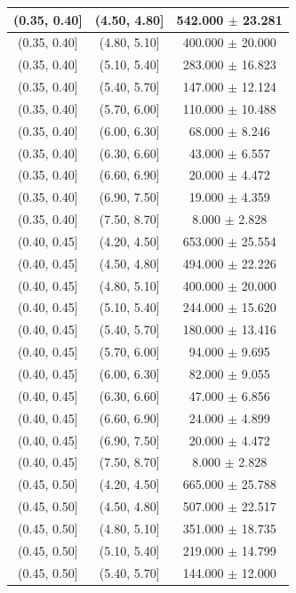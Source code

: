 \begin{longtable}{|c|c|c|}
\hline
(0.35, 0.40] & (4.50, 4.80] & 542.000 $\pm$ 23.281 \\ 
\hline
(0.35, 0.40] & (4.80, 5.10] & 400.000 $\pm$ 20.000 \\ 
\hline
(0.35, 0.40] & (5.10, 5.40] & 283.000 $\pm$ 16.823 \\ 
\hline
(0.35, 0.40] & (5.40, 5.70] & 147.000 $\pm$ 12.124 \\ 
\hline
(0.35, 0.40] & (5.70, 6.00] & 110.000 $\pm$ 10.488 \\ 
\hline
(0.35, 0.40] & (6.00, 6.30] & 68.000 $\pm$ 8.246 \\ 
\hline
(0.35, 0.40] & (6.30, 6.60] & 43.000 $\pm$ 6.557 \\ 
\hline
(0.35, 0.40] & (6.60, 6.90] & 20.000 $\pm$ 4.472 \\ 
\hline
(0.35, 0.40] & (6.90, 7.50] & 19.000 $\pm$ 4.359 \\ 
\hline
(0.35, 0.40] & (7.50, 8.70] & 8.000 $\pm$ 2.828 \\ 
\hline
(0.40, 0.45] & (4.20, 4.50] & 653.000 $\pm$ 25.554 \\ 
\hline
(0.40, 0.45] & (4.50, 4.80] & 494.000 $\pm$ 22.226 \\ 
\hline
(0.40, 0.45] & (4.80, 5.10] & 400.000 $\pm$ 20.000 \\ 
\hline
(0.40, 0.45] & (5.10, 5.40] & 244.000 $\pm$ 15.620 \\ 
\hline
(0.40, 0.45] & (5.40, 5.70] & 180.000 $\pm$ 13.416 \\ 
\hline
(0.40, 0.45] & (5.70, 6.00] & 94.000 $\pm$ 9.695 \\ 
\hline
(0.40, 0.45] & (6.00, 6.30] & 82.000 $\pm$ 9.055 \\ 
\hline
(0.40, 0.45] & (6.30, 6.60] & 47.000 $\pm$ 6.856 \\ 
\hline
(0.40, 0.45] & (6.60, 6.90] & 24.000 $\pm$ 4.899 \\ 
\hline
(0.40, 0.45] & (6.90, 7.50] & 20.000 $\pm$ 4.472 \\ 
\hline
(0.40, 0.45] & (7.50, 8.70] & 8.000 $\pm$ 2.828 \\ 
\hline
(0.45, 0.50] & (4.20, 4.50] & 665.000 $\pm$ 25.788 \\ 
\hline
(0.45, 0.50] & (4.50, 4.80] & 507.000 $\pm$ 22.517 \\ 
\hline
(0.45, 0.50] & (4.80, 5.10] & 351.000 $\pm$ 18.735 \\ 
\hline
(0.45, 0.50] & (5.10, 5.40] & 219.000 $\pm$ 14.799 \\ 
\hline
(0.45, 0.50] & (5.40, 5.70] & 144.000 $\pm$ 12.000 \\ 

\end{longtable}
